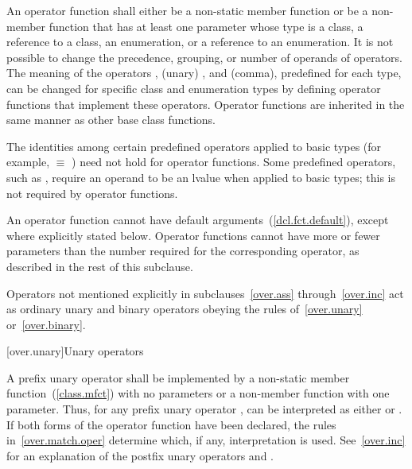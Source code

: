 \pnum
{}%
An operator function
shall either be a non-static member function or be a non-member function that
has at least one parameter whose type is a class, a reference to a class, an
enumeration, or a reference to an enumeration.
It is not possible to change the precedence, grouping, or number of operands
of operators.
The meaning of the operators
\tcode{=},
(unary)
\tcode{\&},
and
\tcode{,}
(comma), predefined for each type, can be changed for specific
class and enumeration types by
defining operator functions that implement these operators.
%
Operator functions are inherited in the same manner as other base class
functions.

\pnum
{}%
The identities among certain predefined operators applied to basic types
(for example,
 $\equiv$
)
need not hold for operator functions.
Some predefined operators, such as
\tcode{+=},
require an operand to be an lvalue when applied to basic types;
this is not required by operator functions.

\pnum
{}%
An operator function cannot have default arguments~(\ref{dcl.fct.default}),
except where explicitly stated below.
Operator
functions cannot have more or fewer parameters than the
number required for the corresponding operator, as
described in the rest of this subclause.

\pnum
Operators not mentioned explicitly in subclauses~\ref{over.ass} through~\ref{over.inc}
act as ordinary unary and binary
operators obeying the rules of~\ref{over.unary} or~\ref{over.binary}.%
%

[over.unary]{Unary operators}%
%

\pnum
A prefix unary operator shall be implemented by a
non-static member function~(\ref{class.mfct}) with no parameters or a
non-member function with one parameter.
%
Thus, for any prefix unary operator
,
can be interpreted as either
or
.
If both forms of the operator function have been declared,
the rules in~\ref{over.match.oper} determine which, if any, interpretation is
used.
See~\ref{over.inc} for an explanation of the postfix unary operators
\tcode{++}
and
\tcode{\dcr}.

